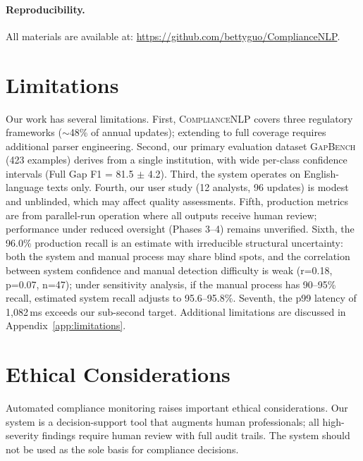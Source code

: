 \documentclass[11pt]{article}
\begin{document}
\paragraph{Reproducibility.} All materials are available at: \url{https://github.com/bettyguo/ComplianceNLP}.

\section*{Limitations}

Our work has several limitations. First, \textsc{ComplianceNLP} covers three regulatory frameworks ($\sim$48\% of annual updates); extending to full coverage requires additional parser engineering. Second, our primary evaluation dataset \textsc{GapBench} (423 examples) derives from a single institution, with wide per-class confidence intervals (Full Gap F1 = 81.5 $\pm$ 4.2). Third, the system operates on English-language texts only. Fourth, our user study (12 analysts, 96 updates) is modest and unblinded, which may affect quality assessments. Fifth, production metrics are from parallel-run operation where all outputs receive human review; performance under reduced oversight (Phases 3--4) remains unverified. Sixth, the 96.0\% production recall is an estimate with irreducible structural uncertainty: both the system and manual process may share blind spots, and the correlation between system confidence and manual detection difficulty is weak (r=0.18, p=0.07, n=47); under sensitivity analysis, if the manual process has 90–95\% recall, estimated system recall adjusts to 95.6–95.8\%. Seventh, the p99 latency of 1{,}082\,ms exceeds our sub-second target. Additional limitations are discussed in Appendix~\ref{app:limitations}.


\section*{Ethical Considerations}

Automated compliance monitoring raises important ethical considerations. Our system is a decision-support tool that augments human professionals; all high-severity findings require human review with full audit trails. The system should not be used as the sole basis for compliance decisions.
\end{document}
